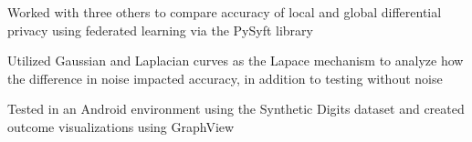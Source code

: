 \documentclass[letterpaper]{resume}
\begin{document}
\begin{compactitem}
\item Worked with three others to compare accuracy of local and global differential privacy using federated learning via the PySyft library
\item Utilized Gaussian and Laplacian curves as the Lapace mechanism to analyze how the difference in noise impacted accuracy, in addition to testing without noise
\item Tested in an Android environment using the Synthetic Digits dataset and created outcome visualizations using GraphView
\end{compactitem}

\end{document}
